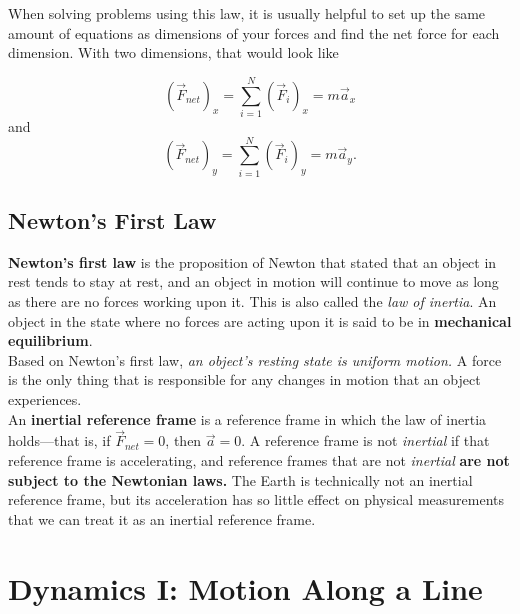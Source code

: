 \documentclass[12pt,letterpaper]{article}
\begin{document}
When solving problems using this law, it is usually helpful to set up the same amount of equations as dimensions of your forces and find the net force for each dimension. With two dimensions, that would look like

\begin{center}
	$$(\vec{F}_{net})_{x} = \sum_{i = 1}^{N}(\vec{F}_{i})_{x} = m\vec{a}_{x}$$
	and
	$$(\vec{F}_{net})_{y} = \sum_{i = 1}^{N}(\vec{F}_{i})_{y} = m\vec{a}_{y}.$$
\end{center}

\subsection[Newton's First Law]{Newton's First Law}

\textbf{Newton's first law} is the proposition of Newton that stated that an object in rest tends to stay at rest, and an object in motion will continue to move as long as there are no forces working upon it. This is also called the \textit{law of inertia}. An object in the state where no forces are acting upon it is said to be in \textbf{mechanical equilibrium}. \\

Based on Newton's first law, \textit{an object's resting state is uniform motion.} A force is the only thing that is responsible for any changes in motion that an object experiences. \\

An \textbf{inertial reference frame} is a reference frame in which the law of inertia holds---that is, if $\vec{F}_{net} = 0$, then $\vec{a} = 0$. A reference frame is not \textit{inertial} if that reference frame is accelerating, and reference frames that are not \textit{inertial} \textbf{are not subject to the Newtonian laws.} The Earth is technically not an inertial reference frame, but its acceleration has so little effect on physical measurements that we can treat it as an inertial reference frame. \\

\pagebreak

\section[Dynamics I: Motion Along a Line]{Dynamics I: Motion Along a Line}
\end{document}
